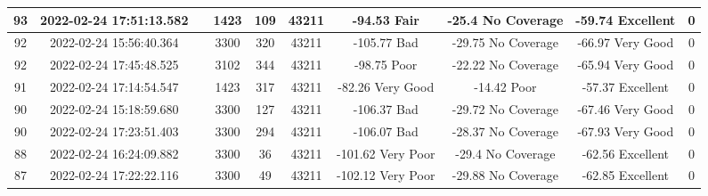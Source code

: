 \begin{longtable*}{|c|c|c|c|c|c|c|c|c|c|}
93&2022-02-24 17:51:13.582&&1423&109&43211& -94.53    Fair        & -25.4     No Coverage & -59.74    Excellent   & 0\\\hline
{}92&2022-02-24 15:56:40.364&&3300&320&43211& -105.77   Bad         & -29.75    No Coverage & -66.97    Very Good   & 0\\\hline
{}92&2022-02-24 17:45:48.525&&3102&344&43211& -98.75    Poor        & -22.22    No Coverage & -65.94    Very Good   & 0\\\hline
{}91&2022-02-24 17:14:54.547&&1423&317&43211& -82.26    Very Good   & -14.42    Poor        & -57.37    Excellent   & 0\\\hline
{}90&2022-02-24 15:18:59.680&&3300&127&43211& -106.37   Bad         & -29.72    No Coverage & -67.46    Very Good   & 0\\\hline
{}90&2022-02-24 17:23:51.403&&3300&294&43211& -106.07   Bad         & -28.37    No Coverage & -67.93    Very Good   & 0\\\hline
{}88&2022-02-24 16:24:09.882&&3300&36&43211& -101.62   Very Poor   & -29.4     No Coverage & -62.56    Excellent   & 0\\\hline
{}87&2022-02-24 17:22:22.116&&3300&49&43211& -102.12   Very Poor   & -29.88    No Coverage & -62.85    Excellent   & 0\\\hline

\end{longtable*}
